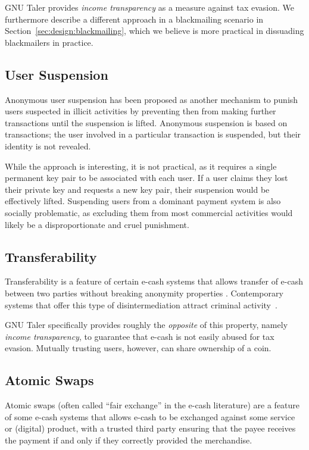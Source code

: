 GNU Taler provides \emph{income transparency} as a measure against tax evasion.
We furthermore describe a different approach in a blackmailing scenario in
Section~\ref{sec:design:blackmailing}, which we believe is more practical in
dissuading blackmailers in practice.

\subsection{User Suspension}

Anonymous user suspension \cite{au2011electronic} has been proposed as
another mechanism to punish users suspected in illicit activities by
preventing then from making further transactions until the suspension is
lifted.  Anonymous suspension is based on transactions; the user
involved in a particular transaction is suspended, but their identity is not
revealed.

While the approach is interesting, it is not practical, as it requires
a single permanent key pair to be associated with each user.  If a
user claims they lost their private key and requests a new key pair,
their suspension would be effectively lifted. Suspending users from a
dominant payment system is also socially problematic, as excluding
them from most commercial activities would likely be a
disproportionate and cruel punishment.

\subsection{Transferability}

Transferability is a feature of certain e-cash systems that allows
transfer of e-cash between two parties without breaking anonymity
properties \cite{fuchsbauer2009transferable}.  Contemporary systems
that offer this type of disintermediation attract criminal
activity~\cite{richet2016extortion}.

GNU Taler specifically provides roughly the \emph{opposite} of this property,
namely \emph{income transparency}, to guarantee that e-cash is not easily
abused for tax evasion.  Mutually trusting users, however, can share ownership
of a coin.

\subsection{Atomic Swaps}

Atomic swaps (often called ``fair exchange'' in the e-cash literature) are a
feature of some e-cash systems that allows e-cash
to be exchanged against some service or (digital) product, with a trusted third
party ensuring that the payee receives the payment if and only if they correctly
provided the merchandise.

